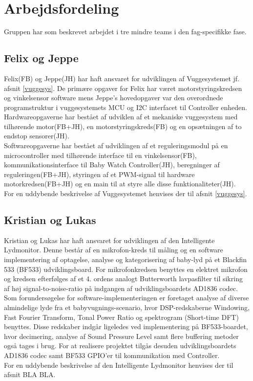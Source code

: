 \section{Arbejdsfordeling}

Gruppen har som beskrevet arbejdet i tre mindre teams i den fag-specifikke fase. 

\subsection*{Felix og Jeppe}
Felix(FB) og Jeppe(JH) har haft ansvaret for udviklingen af Vuggesystemet jf. afsnit \vref{vuggesys}. De primære opgaver for Felix har været motorstyringskredsen og vinkelsensor software mens Jeppe's hovedopgaver var den overordnede programstruktur i vuggesystemets MCU og I2C interfacet til Controller enheden.\\ 
Hardwareopgaverne har bestået af udviklen af et mekaniske vuggesystem med tilhørende motor(FB+JH), en motorstyringskreds(FB) og en opsætningen af to endstop sensorer(JH).\\
Softwareopgaverne har bestået af udviklingen af et reguleringsmodul på en microcontroller med tilhørende interface til en vinkelsensor(FB), kommunikationsinterface til Baby Watch Controller(JH), beregninger af reguleringen(FB+JH), styringen af et PWM-signal til hardware motorkredsen(FB+JH) og en main til at styre alle disse funktionaliteter(JH). \\
For en uddybende beskrivelse af Vuggesystemet henvises der til afsnit \vref{vuggesys}.
\subsection*{Kristian og Lukas}
Kristian og Lukas har haft ansvaret for udviklingen af den Intelligente Lydmonitor. Denne består af en mikrofon-kreds til måling  og en software implementering af optagelse, analyse og kategorisering af baby-lyd på et Blackfin 533 (BF533) udviklingsboard. For mikrofonkredsen benyttes en elektret mikrofon og kredsen efterfølges af et 4. ordens analogt Butterworth lavpasfilter til sikring af høj signal-to-noise-ratio på indgangen af udviklingsboardets AD1836 codec. Som forundersøgelse for software-implementeringen er foretaget analyse af diverse almindelige lyde fra et babyvugnings-scenario, hvor DSP-redskaberne Windowing, Fast Fourier Transform, Tonal Power Ratio og spektrogram (Short-time DFT) benyttes. Disse redskaber indgår ligeledes ved implementering på BF533-boardet, hvor decimering, analyse af Sound Pressure Level samt flere buffering metoder også tages i brug. For at realisere projektet tilgås desuden udviklingsboardets AD1836 codec samt BF533 GPIO'er til kommunikation med Controller.  \\
For en uddybende beskrivelse af den Intelligente Lydmonitor henvises der til afsnit BLA BLA.


